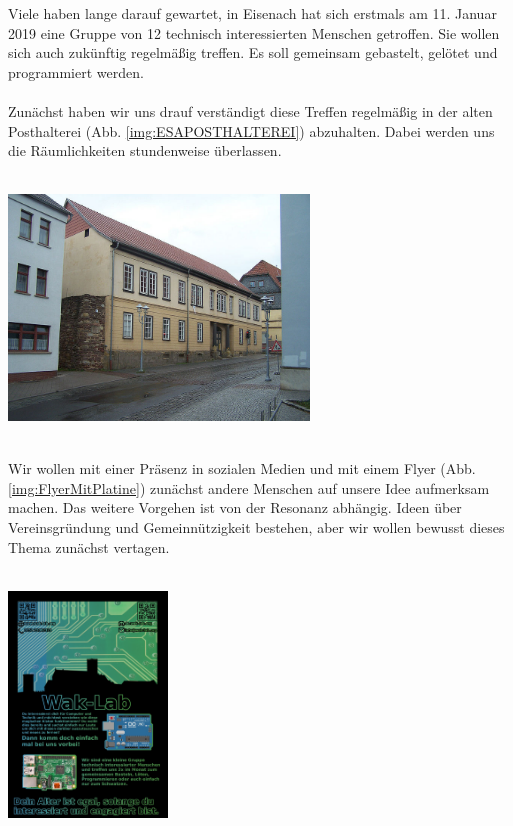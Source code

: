Viele haben lange darauf gewartet, in Eisenach hat sich erstmals am 11. Januar  2019 eine Gruppe von 12 technisch interessierten Menschen getroffen. Sie wollen sich auch zukünftig regelmä\ss ig treffen. Es soll gemeinsam gebastelt, gelötet und programmiert werden.\\
\ \\
Zunächst haben wir uns drauf verständigt diese Treffen regelmäßig in der alten Posthalterei (Abb. \ref{img:ESAPOSTHALTEREI}) abzuhalten. Dabei werden uns die Räumlichkeiten stundenweise überlassen.\\
\ \\
\begin{minipage}[t]{\textwidth}
  \centering
  \includegraphics[height=6cm]{pictures/800px-ESAPOSTHALTEREI.jpg}
  \label{img:ESAPOSTHALTEREI}
\end{minipage}
\ \\
Wir wollen mit einer Präsenz in sozialen Medien und mit einem Flyer (Abb. \ref{img:FlyerMitPlatine}) zunächst andere Menschen auf unsere Idee aufmerksam machen. Das weitere Vorgehen ist von der Resonanz abhängig. Ideen über Vereinsgründung und Gemeinnützigkeit bestehen, aber wir wollen bewusst dieses Thema zunächst vertagen. \\
\ \\
\begin{minipage}[t]{0.5\textwidth}
  \centering
  \includegraphics[height=6cm]{pictures/FlyerMitPlatine.jpg}
  \label{img:FlyerMitPlatine}
\end{minipage}
